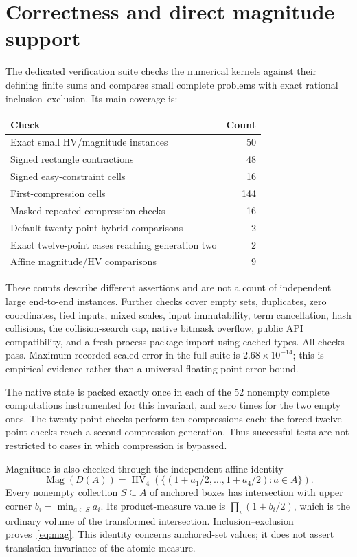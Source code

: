 \documentclass[12pt,a4paper]{article}
\begin{document}
\section{Correctness and direct magnitude support}
The dedicated verification suite checks the numerical kernels against their
defining finite sums and compares small complete problems with exact rational
inclusion--exclusion. Its main coverage is:
\begin{center}\small
\begin{tabular}{lr}\toprule
Check & Count\\\midrule
Exact small HV/magnitude instances & 50\\
Signed rectangle contractions & 48\\
Signed easy-constraint cells & 16\\
First-compression cells & 144\\
Masked repeated-compression checks & 16\\
Default twenty-point hybrid comparisons & 2\\
Exact twelve-point cases reaching generation two & 2\\
Affine magnitude/HV comparisons & 9\\\bottomrule
\end{tabular}
\end{center}
These counts describe different assertions and are not a count of independent
large end-to-end instances. Further checks cover empty sets, duplicates, zero
coordinates, tied inputs, mixed scales, input immutability, term cancellation,
hash collisions, the collision-search cap, native bitmask overflow, public
API compatibility, and a fresh-process package import using cached types.
All checks pass. Maximum recorded scaled error in the full suite is
$2.68\times10^{-14}$; this is empirical evidence rather than a universal
floating-point error bound.

The native state is packed exactly once in each of the 52 nonempty complete
computations instrumented for this invariant, and zero times for the two empty
ones. The twenty-point checks perform ten compressions each; the forced
twelve-point checks reach a second compression generation. Thus successful
tests are not restricted to cases in which compression is bypassed.

Magnitude is also checked through the independent affine identity
\begin{equation}
 \operatorname{Mag}(D(A))=
 \operatorname{HV}_4\!\left(\{(1+a_1/2,\ldots,1+a_4/2):a\in A\}\right).
 \label{eq:mag}
\end{equation}
Every nonempty collection $S\subseteq A$ of anchored boxes has intersection
with upper corner $b_i=\min_{a\in S}a_i$. Its product-measure value is
$\prod_i(1+b_i/2)$, which is the ordinary volume of the transformed
intersection. Inclusion--exclusion proves~\eqref{eq:mag}. This identity
concerns anchored-set values; it does not assert translation invariance of
the atomic measure.
\end{document}
